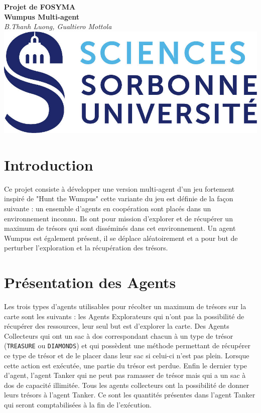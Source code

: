 \documentclass[10pt]{article}
\begin{document}
\begin{center}
	\textbf{\huge Projet de FOSYMA\\[.5cm] Wumpus Multi-agent}\\[.5cm]
	\vspace{1.5cm}
	\textit{\Large B.Thanh Luong, Gualtiero Mottola}\\
	\vspace{1.5cm}
	\includegraphics{logo}
	\vspace{1.5cm}
	\tableofcontents
\end{center}

\newpage

\section{Introduction}
	Ce projet consiste à développer une version multi-agent d'un jeu fortement inspiré de "Hunt the Wumpus" cette variante du jeu est définie de la façon suivante : un ensemble d'agents en coopération sont placés dans un environnement inconnu. Ils ont pour mission d'explorer et de récupérer un maximum de trésors qui sont disséminés dans cet environnement. Un agent Wumpus est également présent, il se déplace aléatoirement et a pour but de perturber l'exploration et la récupération des trésors.
	
\section{Présentation des Agents}
	Les trois types d'agents utilisables pour récolter un maximum de trésors sur la carte sont les suivants : les Agents Explorateurs qui n'ont pas la possibilité de récupérer des ressources, leur seul but est d'explorer la carte. Des Agents Collecteurs qui ont un sac à dos correspondant chacun à un type de trésor (\texttt{TREASURE} ou \texttt{DIAMONDS}) et qui possèdent une méthode permettant de récupérer ce type de trésor et de le placer dans leur sac si celui-ci n'est pas plein. Lorsque cette action est exécutée, une partie du trésor est perdue. Enfin le dernier type d'agent, l'agent Tanker qui ne peut pas ramasser de trésor mais qui a un sac à dos de capacité illimitée. Tous les agents collecteurs ont la possibilité de donner leurs trésors à l'agent Tanker. Ce sont les quantités présentes dans l'agent Tanker qui seront comptabilisées à la fin de l'exécution.
\end{document}
